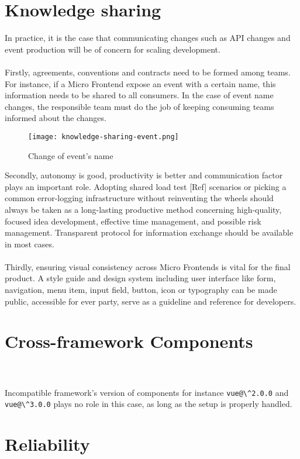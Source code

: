 \documentclass[a4paper]{book}
\begin{document}
\section{Knowledge sharing }
In practice, it is the case that communicating changes such as API changes and event production will be of concern for scaling development. 
\\ \\
Firstly, agreements, conventions and contracts need to be formed among teams. For instance, if a Micro Frontend expose an event with a certain name, this information needs to be shared to all consumers. In the case of event name changes, the responsible team must do the job of keeping consuming teams informed about the changes.
\begin{figure}[h!]
    \centering
    \captionsetup{justification=centering}
    \texttt{[image: knowledge-sharing-event.png]}
    \caption{Change of event's name \cite{Rap20}}
    \label{fig:5}
\end{figure}
Secondly, autonomy is good, productivity is better and communication factor plays an important role. Adopting shared load test [Ref] scenarios or picking a common error-logging infrastructure without reinventing the wheels should always be taken as a long-lasting productive method concerning high-quality, focused idea development, effective time management, and possible risk management. Transparent protocol for information exchange should be available in most cases.
\\ \\
Thirdly, ensuring visual consistency across Micro Frontends is vital for the final product. A style guide and design system including user interface like form, navigation, menu item, input field, button, icon or typography can be made public, accessible for ever party, serve as a guideline and reference for developers.

\section{Cross-framework Components}

\\ \\
Incompatible framework's version of components for instance \verb|vue@\^2.0.0| and \verb|vue@\^3.0.0| plays no role in this case, as long as the setup is properly handled.

\section{Reliability}
\end{document}
